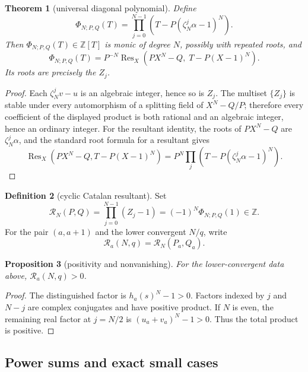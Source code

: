 \documentclass[11pt]{article}
\newtheorem{theorem}{Theorem}[section]
\newtheorem{proposition}[theorem]{Proposition}
\theoremstyle{definition}
\newtheorem{definition}[theorem]{Definition}
\theoremstyle{remark}
\DeclareMathOperator{\Res}{Res}
\newcommand{\ZZ}{\mathbb Z}
\begin{document}
\begin{theorem}[universal diagonal polynomial]\label{thm:universal-poly}
Define
\[
\Phi_{N;P,Q}(T)=\prod_{j=0}^{N-1}\left(T-P(\zeta_N^j\alpha-1)^N\right).
\]
Then \(\Phi_{N;P,Q}(T)\in\ZZ[T]\) is monic of degree \(N\), possibly with repeated roots, and
\begin{equation}\label{eq:resultant}
\Phi_{N;P,Q}(T)
=P^{-N}\Res_X\!\left(PX^N-Q,\;T-P(X-1)^N\right).
\end{equation}
Its roots are precisely the \(Z_j\).
\end{theorem}

\begin{proof}
Each \(\zeta_N^jv-u\) is an algebraic integer, hence so is \(Z_j\).  The multiset \(\{Z_j\}\) is stable under every automorphism of a splitting field of \(X^N-Q/P\); therefore every coefficient of the displayed product is both rational and an algebraic integer, hence an ordinary integer.  For the resultant identity, the roots of \(PX^N-Q\) are \(\zeta_N^j\alpha\), and the standard root formula for a resultant gives
\[
\Res_X(PX^N-Q,T-P(X-1)^N)
=P^N\prod_j\left(T-P(\zeta_N^j\alpha-1)^N\right).
\]
\end{proof}

\begin{definition}[cyclic Catalan resultant]
Set
\begin{equation}\label{eq:cyclicR}
\mathscr R_N(P,Q)
=\prod_{j=0}^{N-1}(Z_j-1)
=(-1)^N\Phi_{N;P,Q}(1)\in\ZZ.
\end{equation}
For the pair \((a,a+1)\) and the lower convergent \(N/q\), write
\[
\mathscr R_a(N,q)=\mathscr R_N(P_a,Q_a).
\]
\end{definition}

\begin{proposition}[positivity and nonvanishing]\label{prop:positive}
For the lower-convergent data above, \(\mathscr R_a(N,q)>0\).
\end{proposition}

\begin{proof}
The distinguished factor is \(h_a(s)^N-1>0\).  Factors indexed by \(j\) and \(N-j\) are complex conjugates and have positive product.  If \(N\) is even, the remaining real factor at \(j=N/2\) is \((u_a+v_a)^N-1>0\).  Thus the total product is positive.
\end{proof}

\subsection{Power sums and exact small cases}
\end{document}
